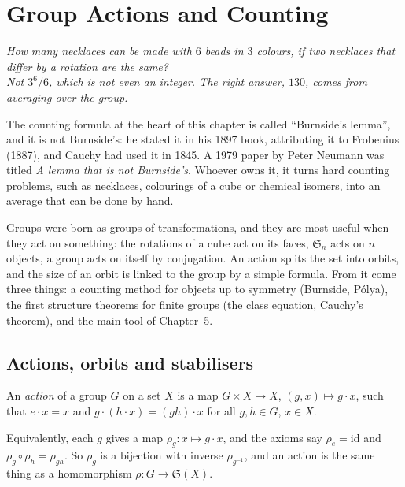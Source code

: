 \chapter{Group Actions and Counting}

\begin{center}\itshape
How many necklaces can be made with $6$ beads in $3$ colours, if two necklaces that differ by a rotation are the same?\\
Not $3^6/6$, which is not even an integer. The right answer, $130$, comes from averaging over the group.
\end{center}

The counting formula at the heart of this chapter is called ``Burnside's lemma'', and it is not Burnside's: he stated it in his 1897 book,
attributing it to Frobenius (1887), and Cauchy had used it in 1845. A 1979 paper by Peter Neumann was titled \emph{A lemma that is not Burnside's}.
Whoever owns it, it turns hard counting problems, such as necklaces, colourings of a cube or chemical isomers, into an average that can be done by hand.

Groups were born as groups of transformations, and they are most useful when they act on something: the rotations of a cube act on its faces, $\mathfrak S_n$ acts on $n$ objects, a group acts on itself by conjugation. An action splits the set into orbits, and the size of an orbit is linked to the group by a simple formula. From it come three things: a counting method for objects up to symmetry (Burnside, P\'olya), the first structure theorems for finite groups (the class equation, Cauchy's theorem), and the main tool of Chapter~5.

\section{Actions, orbits and stabilisers}

\begin{definition}
An \emph{action} of a group $G$ on a set $X$ is a map $G\times X\to X$, $(g,x)\mapsto g\cdot x$, such that $e\cdot x=x$ and $g\cdot(h\cdot x)=(gh)\cdot x$ for all $g,h\in G$, $x\in X$.
\end{definition}

Equivalently, each $g$ gives a map $\rho_g:x\mapsto g\cdot x$, and the axioms say $\rho_e=\mathrm{id}$ and $\rho_g\circ\rho_h=\rho_{gh}$. So $\rho_g$ is a bijection with inverse $\rho_{g^{-1}}$, and an action is the same thing as a homomorphism $\rho:G\to\mathfrak S(X)$.

